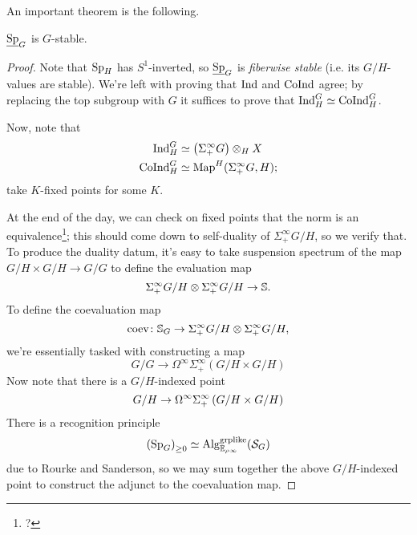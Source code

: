 \documentclass{amsart}
\begin{document}
An important theorem is the following.
\begin{theorem}
  $\underline{\operatorname{Sp}}_G$ is $G$-stable.
\end{theorem}
\begin{proof}
  Note that $\operatorname{Sp}_H$ has $S^1$-inverted, so $\underline{\operatorname{Sp}}_G$ is \emph{fiberwise stable} (i.e. its $G/H$-values are stable).
  We're left with proving that $\mathrm{Ind}$ and $\mathrm{CoInd}$ agree;
  by replacing the top subgroup with $G$ it suffices to prove that $\mathrm{Ind}_H^G \simeq \mathrm{CoInd}_H^G$.

  Now, note that
  \begin{align*}
    \mathrm{Ind}_H^G &\simeq \left( \Sigma_+^\infty G \right) \otimes_H X\\
      \mathrm{CoInd}_H^G &\simeq \operatorname{Map}^H(\Sigma_+^\infty G, H);
  \end{align*}
  take $K$-fixed points for some $K$.

  At the end of the day, we can check on fixed points that the norm is an equivalence\footnote{?};
  this should come down to self-duality of $\Sigma_+^\infty G/H$, so we verify that.
  To produce the duality datum, it's easy to take suspension spectrum of the map $G/H \times G/H \rightarrow G/G$ to define the evaluation map
  \[
    \Sigma^\infty_+ G/H \otimes \Sigma^\infty_+ G/H \rightarrow \mathbb{S}.
  \]
  To define the coevaluation map
  \[
    \mathrm{coev}\colon  \mathbb{S}_G \rightarrow \Sigma_+^\infty G/H \otimes \Sigma_+^\infty G/H,
  \]
  we're essentially tasked with constructing a map
  \[
    G/G \rightarrow \Omega^\infty \Sigma_+^\infty(G/H \times G/H)
  \]
  Now note that there is a $G/H$-indexed point
  \[
    G/H \rightarrow \Omega^\infty \Sigma_+^\infty \left( G/H \times G/H \right)
  \]
  There is a recognition principle
  \[
    \left( \operatorname{Sp}_G \right)_{\geq 0} \simeq \mathrm{Alg}_{\mathbb{E}_{\rho \infty}}^{\mathrm{grplike}}(\mathcal{S}_G)
  \]
  due to Rourke and Sanderson,
  so we may sum together the above $G/H$-indexed point to construct the adjunct to the coevaluation map.
\end{proof}
\end{document}
